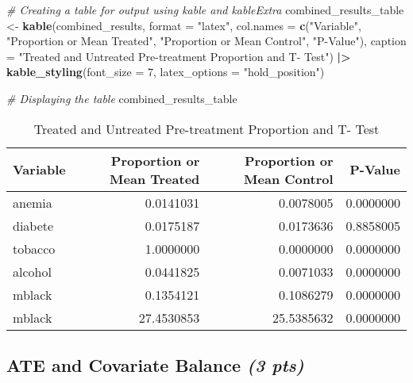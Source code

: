 \documentclass[
]{article}
\newenvironment{Shaded}{\begin{snugshade}}{\end{snugshade}}
\newcommand{\AttributeTok}[1]{\textcolor[rgb]{0.13,0.29,0.53}{#1}}
\newcommand{\CommentTok}[1]{\textcolor[rgb]{0.56,0.35,0.01}{\textit{#1}}}
\newcommand{\DecValTok}[1]{\textcolor[rgb]{0.00,0.00,0.81}{#1}}
\newcommand{\FunctionTok}[1]{\textcolor[rgb]{0.13,0.29,0.53}{\textbf{#1}}}
\newcommand{\NormalTok}[1]{#1}
\newcommand{\OtherTok}[1]{\textcolor[rgb]{0.56,0.35,0.01}{#1}}
\newcommand{\SpecialCharTok}[1]{\textcolor[rgb]{0.81,0.36,0.00}{\textbf{#1}}}
\newcommand{\StringTok}[1]{\textcolor[rgb]{0.31,0.60,0.02}{#1}}
\begin{document}
\begin{Shaded}
\begin{Highlighting}[]
\CommentTok{\# Creating a table for output using kable and kableExtra}
\NormalTok{combined\_results\_table }\OtherTok{\textless{}{-}} \FunctionTok{kable}\NormalTok{(combined\_results, }\AttributeTok{format =} \StringTok{"latex"}\NormalTok{,}
\AttributeTok{col.names =} \FunctionTok{c}\NormalTok{(}\StringTok{"Variable"}\NormalTok{, }\StringTok{"Proportion or Mean Treated"}\NormalTok{,}
\StringTok{"Proportion or Mean Control"}\NormalTok{, }\StringTok{"P{-}Value"}\NormalTok{),}
\AttributeTok{caption =} \StringTok{"Treated and Untreated Pre{-}treatment Proportion and T{-} Test"}\NormalTok{) }\SpecialCharTok{|\textgreater{}} 
\FunctionTok{kable\_styling}\NormalTok{(}\AttributeTok{font\_size =} \DecValTok{7}\NormalTok{, }\AttributeTok{latex\_options =} \StringTok{"hold\_position"}\NormalTok{)}

\CommentTok{\# Displaying the table}
\NormalTok{combined\_results\_table}
\end{Highlighting}
\end{Shaded}

\begin{table}[!h]
\centering
\caption{\label{tab:unnamed-chunk-3}Treated and Untreated Pre-treatment Proportion and T- Test}
\centering
\fontsize{7}{9}\selectfont
\begin{tabular}[t]{l|r|r|r}
\hline
Variable & Proportion or Mean Treated & Proportion or Mean Control & P-Value\\
\hline
anemia & 0.0141031 & 0.0078005 & 0.0000000\\
\hline
diabete & 0.0175187 & 0.0173636 & 0.8858005\\
\hline
tobacco & 1.0000000 & 0.0000000 & 0.0000000\\
\hline
alcohol & 0.0441825 & 0.0071033 & 0.0000000\\
\hline
mblack & 0.1354121 & 0.1086279 & 0.0000000\\
\hline
mblack & 27.4530853 & 25.5385632 & 0.0000000\\
\hline
\end{tabular}
\end{table}

\hypertarget{ate-and-covariate-balance-3-pts}{%
\subsection{\texorpdfstring{ATE and Covariate Balance \emph{(3
pts)}}{ATE and Covariate Balance (3 pts)}}\label{ate-and-covariate-balance-3-pts}}
\end{document}
